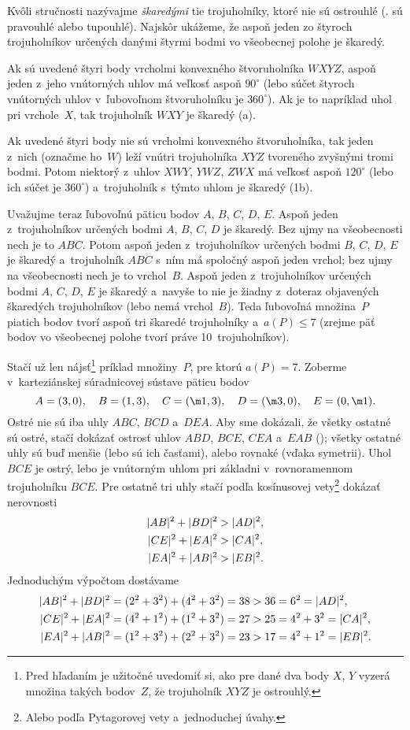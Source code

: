 {%
Kvôli stručnosti nazývajme {\it škaredými\/} tie trojuholníky, ktoré nie sú ostrouhlé (\tj. sú pravouhlé alebo tupouhlé). Najskôr ukážeme, že aspoň jeden zo štyroch trojuholníkov určených danými štyrmi bodmi vo všeobecnej polohe je škaredý.

Ak sú uvedené štyri body vrcholmi konvexného štvoruholníka $W\!XY\!Z$, aspoň jeden z~jeho vnútorných uhlov má veľkosť aspoň $90^\circ$ (lebo súčet štyroch vnútorných uhlov v~ľubovoľnom štvoruholníku je $360^\circ$). Ak je to napríklad uhol pri vrchole~$X$, tak trojuholník $W\!XY$ je škaredý (\obr{}a).

Ak uvedené štyri body nie sú vrcholmi konvexného štvoruholníka, tak jeden z~nich (označme ho~$W$) leží vnútri trojuholníka $XY\!Z$ tvoreného zvyšnými tromi bodmi. Potom niektorý z~uhlov $X\!WY$, $YW\!Z$, $ZW\!X$ má veľkosť aspoň $120^\circ$ (lebo ich súčet je $360^\circ$) a~trojuholník s~týmto uhlom je škaredý (\obrr1b).
%

\smallskip
Uvažujme teraz ľubovoľnú päticu bodov $A$, $B$, $C$, $D$, $E$. Aspoň jeden z~trojuholníkov určených bodmi $A$, $B$, $C$, $D$ je škaredý. Bez ujmy na všeobecnosti nech je to $ABC$. Potom aspoň jeden z~trojuholníkov určených bodmi $B$, $C$, $D$, $E$ je škaredý a~trojuholník $ABC$ s~ním má spoločný aspoň jeden vrchol; bez ujmy na všeobecnosti nech je to vrchol~$B$. Aspoň jeden z~trojuholníkov určených bodmi $A$, $C$, $D$, $E$ je škaredý a~navyše to nie je žiadny z~doteraz objavených škaredých trojuholníkov (lebo nemá vrchol~$B$). Teda ľubovoľná množina~$P$ piatich bodov tvorí aspoň tri škaredé trojuholníky a~$a(P)\le7$ (zrejme päť bodov vo všeobecnej polohe tvorí práve 10~trojuholníkov).
%

Stačí už len nájsť\footnote{Pred hľadaním je užitočné uvedomiť si, ako pre dané dva body $X$, $Y$ vyzerá množina takých bodov~$Z$, že trojuholník $XYZ$ je ostrouhlý.} príklad množiny~$P$, pre ktorú $a(P)=7$. Zoberme v~karteziánskej súradnicovej sústave päticu bodov
$$
A=(3,0),\quad B=(1,3),\quad C=(\m1,3),\quad D=(\m3,0),\quad E=(0,\m1).
$$
Ostré nie sú iba uhly $ABC$, $BCD$ a~$DEA$. Aby sme dokázali, že všetky ostatné sú ostré, stačí dokázať ostrosť uhlov $ABD$, $BCE$, $CEA$ a~$EAB$ (\obr); všetky ostatné uhly sú buď menšie (lebo sú ich časťami), alebo rovnaké (vďaka symetrii). Uhol $BCE$ je ostrý, lebo je vnútorným uhlom pri základni v~rovnoramennom trojuholníku $BCE$. Pre ostatné tri uhly stačí podľa kosínusovej vety\footnote{Alebo podľa Pytagorovej vety a~jednoduchej úvahy.} dokázať nerovnosti
$$
\aligned
|AB|^2+|BD|^2 &> |AD|^2,\\
|CE|^2+|EA|^2 &> |CA|^2,\\
|EA|^2+|AB|^2 &> |EB|^2.
\endaligned
$$
Jednoduchým výpočtom dostávame
$$
\aligned
|AB|^2+|BD|^2=(2^2+3^2)+(4^2+3^2)=38 &> 36=6^2=|AD|^2,\\
|CE|^2+|EA|^2=(4^2+1^2)+(1^2+3^2)=27 &> 25=4^2+3^2=|CA|^2,\\
|EA|^2+|AB|^2=(1^2+3^2)+(2^2+3^2)=23 &> 17=4^2+1^2=|EB|^2.
\endaligned
$$
}

